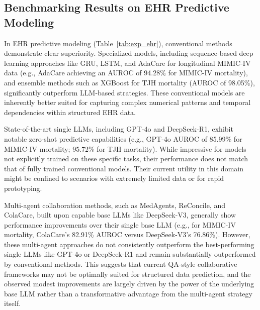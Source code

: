 \documentclass{article}
\begin{document}
\subsection{Benchmarking Results on EHR Predictive Modeling}
In EHR predictive modeling (Table~\ref{tab:exp_ehr}), conventional methods demonstrate clear superiority. Specialized models, including sequence-based deep learning approaches like GRU, LSTM, and AdaCare for longitudinal MIMIC-IV data (e.g., AdaCare achieving an AUROC of 94.28\% for MIMIC-IV mortality), and ensemble methods such as XGBoost for TJH mortality (AUROC of 98.05\%), significantly outperform LLM-based strategies. These conventional models are inherently better suited for capturing complex numerical patterns and temporal dependencies within structured EHR data.

State-of-the-art single LLMs, including GPT-4o and DeepSeek-R1, exhibit notable zero-shot predictive capabilities (e.g., GPT-4o AUROC of 85.99\% for MIMIC-IV mortality; 95.72\% for TJH mortality). While impressive for models not explicitly trained on these specific tasks, their performance does not match that of fully trained conventional models. Their current utility in this domain might be confined to scenarios with extremely limited data or for rapid prototyping.

Multi-agent collaboration methods, such as MedAgents, ReConcile, and ColaCare, built upon capable base LLMs like DeepSeek-V3, generally show performance improvements over their single base LLM (e.g., for MIMIC-IV mortality, ColaCare's 82.91\% AUROC versus DeepSeek-V3's 76.86\%). However, these multi-agent approaches do not consistently outperform the best-performing single LLMs like GPT-4o or DeepSeek-R1 and remain substantially outperformed by conventional methods. This suggests that current QA-style collaborative frameworks may not be optimally suited for structured data prediction, and the observed modest improvements are largely driven by the power of the underlying base LLM rather than a transformative advantage from the multi-agent strategy itself.
\end{document}
